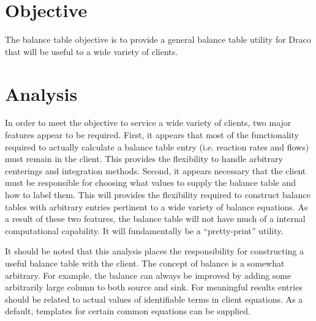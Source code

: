 \documentclass[reqno]{lanl}
\begin{document}
\section*{Objective}
The balance table objective is to provide a general balance table utility
for Draco that will be useful to a wide variety of clients.


\section*{Analysis}

In order to
meet the objective to service a wide variety of clients, two major
features appear to be required. First,  it
appears that most of the
functionality required to actually calculate a balance table entry
(i.e. reaction rates and flows) must remain in the client.
This provides the flexibility to handle arbitrary centerings and integration
methods.
Second, it appears necessary that the client must be
responsible for choosing what values to supply the balance table
and how to label them. This will provides the 
flexibility required to construct balance tables with arbitrary
entries pertinent to a wide variety of balance equations. 
As a result of these two features, the balance table  will not have much of a 
internal computational capability. It will fundamentally be a 
``pretty-print'' utility. 

It should be noted that this analysis places 
the responsibility for constructing a useful balance table
with the client.
The concept of balance is a somewhat arbitrary. For example, the
balance can always be improved by adding some arbitrarily large
column to both source
and sink. For meaningful results entries should be related
to actual values of identifiable terms in client equations.
As a default, templates for certain common equations can be
supplied.
\end{document}
